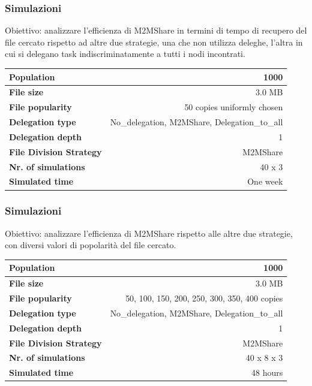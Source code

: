 \documentclass{beamer}
\begin{document}
\begin{frame}
\frametitle{Simulazioni}
Obiettivo: analizzare l'efficienza di M2MShare in termini di tempo di recupero del file cercato rispetto ad altre due strategie, una che non utilizza deleghe, l'altra in cui si delegano task indiscriminatamente a tutti i nodi incontrati.
\small
\begin{table}[h]
\begin{center}
\begin{tabular}{|l|r|}
\hline
\bfseries Population & 1000 \\
\hline
\bfseries File size & 3.0 MB \\
\hline
\bfseries File popularity & 50 copies uniformly chosen \\
\hline
\bfseries Delegation type & No\_delegation, M2MShare, Delegation\_to\_all \\
\hline
\bfseries Delegation depth & 1 \\
\hline
\bfseries File Division Strategy & M2MShare \\
\hline
\bfseries Nr. of simulations & 40 x 3\\
\hline
\bfseries Simulated time & One week \\
\hline
\end{tabular}
\end{center}
\end{table}
\normalsize
\end{frame}

\begin{frame}
\frametitle{Simulazioni}
Obiettivo: analizzare l'efficienza di M2MShare rispetto alle altre due strategie, con diversi valori di popolarità del file cercato.
\small
\begin{table}[h]
\begin{center}
\begin{tabular}{|l|r|}
\hline
\bfseries Population & 1000 \\
\hline
\bfseries File size & 3.0 MB \\
\hline
\bfseries File popularity & 50, 100, 150, 200, 250, 300, 350, 400 copies \\
\hline
\bfseries Delegation type & No\_delegation, M2MShare, Delegation\_to\_all \\
\hline
\bfseries Delegation depth & 1 \\
\hline
\bfseries File Division Strategy & M2MShare \\
\hline
\bfseries Nr. of simulations & 40 x 8 x 3\\
\hline
\bfseries Simulated time & 48 hours \\
\hline
\end{tabular}
\end{center}
\end{table}
\normalsize
\end{frame}
\end{document}
